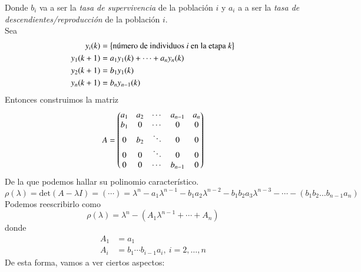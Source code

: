 Donde $b_i$ va a ser la \textit{tasa de supervivencia} de la población $i$ y $a_i$ a a ser la \textit{tasa de descendientes/reproducción} de la población $i$.\\
Sea
\begin{align*}
    y_i(k) &= \left\{\text{número de individuos $i$ en la etapa $k$}\right\}\\
    y_1(k+1) &= a_1y_1(k) + \cdots + a_ny_n(k)\\
    y_2(k+1) &= b_1y_1(k)\\
    y_n(k+1) &= b_ny_{n-1}(k)\\
\end{align*}
Entonces construimos la matriz
$$
    A = \px{
    a_1 & a_2 & \cdots & a_{n-1} & a_n\\
    b_1 & 0 & \cdots & 0 & 0\\
    0 & b_2 & \ddots & 0 & 0\\
    0 & 0 & \ddots & 0 & 0\\
    0 & 0 & \cdots & b_{n-1} & 0
    }
$$
De la que podemos hallar su polinomio característico.
$$
    \rho(\lambda) = \mathrm{det}(A - \lambda I) = (\cdots) = \lambda^n - a_1\lambda^{n-1} - b_1a_2\lambda^{n-2} - b_1b_2a_3\lambda^{n-3} - \cdots - (b_1b_2\ldots b_{n-1}a_n)
$$
Podemos reescribirlo como
$$
    \rho(\lambda) = \lambda^n - (A_1\lambda^{n-1} + \cdots + A_n)
$$
donde
\begin{align*}
    A_1 &= a_1\\
    A_i &= b_1\cdots b_{i-1}a_i,\ i=2,\ldots, n
\end{align*}
De esta forma, vamos a ver ciertos aspectos:
